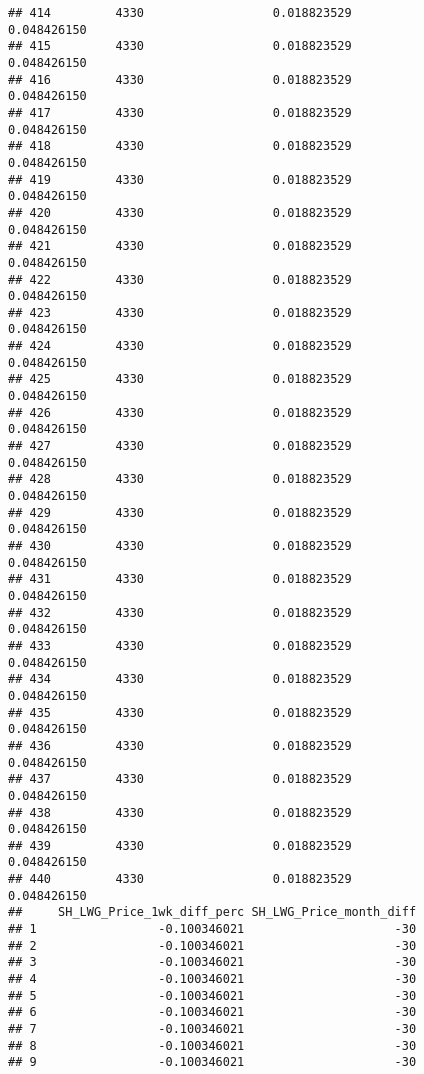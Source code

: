 \documentclass[]{article}
\begin{document}
\begin{verbatim}
## 414         4330                  0.018823529                0.048426150
## 415         4330                  0.018823529                0.048426150
## 416         4330                  0.018823529                0.048426150
## 417         4330                  0.018823529                0.048426150
## 418         4330                  0.018823529                0.048426150
## 419         4330                  0.018823529                0.048426150
## 420         4330                  0.018823529                0.048426150
## 421         4330                  0.018823529                0.048426150
## 422         4330                  0.018823529                0.048426150
## 423         4330                  0.018823529                0.048426150
## 424         4330                  0.018823529                0.048426150
## 425         4330                  0.018823529                0.048426150
## 426         4330                  0.018823529                0.048426150
## 427         4330                  0.018823529                0.048426150
## 428         4330                  0.018823529                0.048426150
## 429         4330                  0.018823529                0.048426150
## 430         4330                  0.018823529                0.048426150
## 431         4330                  0.018823529                0.048426150
## 432         4330                  0.018823529                0.048426150
## 433         4330                  0.018823529                0.048426150
## 434         4330                  0.018823529                0.048426150
## 435         4330                  0.018823529                0.048426150
## 436         4330                  0.018823529                0.048426150
## 437         4330                  0.018823529                0.048426150
## 438         4330                  0.018823529                0.048426150
## 439         4330                  0.018823529                0.048426150
## 440         4330                  0.018823529                0.048426150
##     SH_LWG_Price_1wk_diff_perc SH_LWG_Price_month_diff
## 1                 -0.100346021                     -30
## 2                 -0.100346021                     -30
## 3                 -0.100346021                     -30
## 4                 -0.100346021                     -30
## 5                 -0.100346021                     -30
## 6                 -0.100346021                     -30
## 7                 -0.100346021                     -30
## 8                 -0.100346021                     -30
## 9                 -0.100346021                     -30

\end{verbatim}
\end{document}
